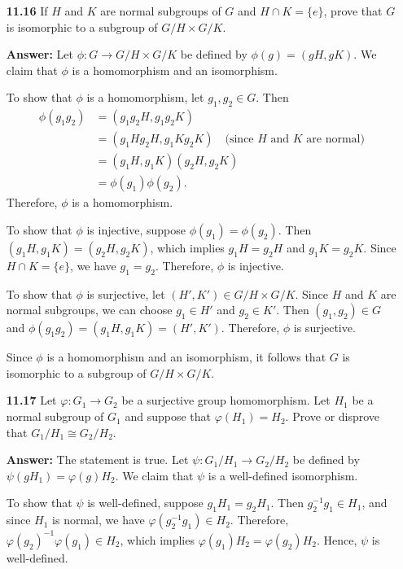 \documentclass[12pt,reqno]{amsart}
\newcommand{\<}{\ensuremath{\langle}}
\renewcommand{\>}{\ensuremath{\rangle}}
\begin{document}
\begin{enumerate}
\bigskip

\item[{\bf 11.16}]
If $H$ and $K$ are normal subgroups of $G$ and $H \cap K = \{ e \}$,
prove that $G$ is isomorphic to a subgroup of $G/H \times G/K$.

\textbf{Answer:} Let $\phi: G \to G/H \times G/K$ be defined by $\phi(g) = (gH, gK)$. We claim that $\phi$ is a homomorphism and an isomorphism.

To show that $\phi$ is a homomorphism, let $g_1, g_2 \in G$. Then
\begin{align*}
    \phi(g_1g_2) &= (g_1g_2H, g_1g_2K) \\
    &= (g_1Hg_2H, g_1Kg_2K) \quad \text{(since $H$ and $K$ are normal)} \\
    &= (g_1H, g_1K)(g_2H, g_2K) \\
    &= \phi(g_1)\phi(g_2).
\end{align*}
Therefore, $\phi$ is a homomorphism.

To show that $\phi$ is injective, suppose $\phi(g_1) = \phi(g_2)$. Then $(g_1H, g_1K) = (g_2H, g_2K)$, which implies $g_1H = g_2H$ and $g_1K = g_2K$. Since $H \cap K = \{e\}$, we have $g_1 = g_2$. Therefore, $\phi$ is injective.

To show that $\phi$ is surjective, let $(H', K') \in G/H \times G/K$. Since $H$ and $K$ are normal subgroups, we can choose $g_1 \in H'$ and $g_2 \in K'$. Then $(g_1, g_2) \in G$ and $\phi(g_1g_2) = (g_1H, g_1K) = (H', K')$. Therefore, $\phi$ is surjective.

Since $\phi$ is a homomorphism and an isomorphism, it follows that $G$ is isomorphic to a subgroup of $G/H \times G/K$.

\bigskip

\newcommand\GHGK{\ensuremath{G/H \times G/K}}
\item[{\bf 11.17}]
Let $\varphi : G_1 \rightarrow G_2$ be a surjective group homomorphism.
Let $H_1$ be a normal subgroup of $G_1$ and suppose that $\varphi(H_1) =
H_2$.  Prove or disprove that $G_1/H_1 \cong G_2/H_2$.

\textbf{Answer:} The statement is true. Let $\psi: G_1/H_1 \to G_2/H_2$ be defined by $\psi(gH_1) = \varphi(g)H_2$. We claim that $\psi$ is a well-defined isomorphism.

To show that $\psi$ is well-defined, suppose $g_1H_1 = g_2H_1$. Then $g_2^{-1}g_1 \in H_1$, and since $H_1$ is normal, we have $\varphi(g_2^{-1}g_1) \in H_2$. Therefore, $\varphi(g_2)^{-1}\varphi(g_1) \in H_2$, which implies $\varphi(g_1)H_2 = \varphi(g_2)H_2$. Hence, $\psi$ is well-defined.


\end{enumerate}
\end{document}
